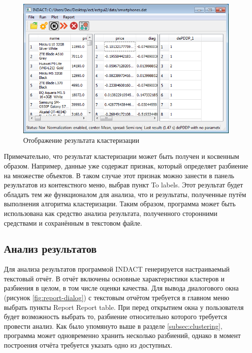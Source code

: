 \documentclass[12pt]{diploma}
\begin{document}
	\begin{figure}[h!]
		\centering
		\includegraphics[width=0.8\linewidth]{img/clustering-result}		
		\caption{Отображение результата кластеризации}
		\label{fig:clustering-result}
	\end{figure}
	
	Примечательно, что результат кластеризации может быть получен и косвенным образом. Например, данные уже содержат признак, который определяет разбиение на множестве объектов. В таком случае этот признак можно занести в панель результатов из контекстного меню, выбрав пункт To labels. Этот результат будет обладать тем же функционалом для анализа, что и результаты, полученные путём выполнения алгоритма кластеризации. Таким образом, программа может быть использована как средство анализа результата, полученного сторонними средствами и сохранённым в текстовом файле.
	
	\subsection{Анализ результатов}
	Для анализа результатов программой INDACT генерируется настраиваемый текстовый отчёт. В отчёт включены основные характеристики кластеров и разбиения в целом, в том числе оценки качества. Для вывода диалогового окна (рисунок \ref{fig:report-dialog}) с текстовым отчётом требуется в главном меню выбрать пункты Report \textrightarrow Report table. При перед открытием окна у пользователя будет возможность выбрать то, разбиение относительно которого требуется провести анализ. Как было упомянуто выше в разделе \ref{subsec:clustering}, программа может одновременно хранить несколько разбиений, однако в момент построения отчёта требуется указать одно из доступных.
	
\end{document}
